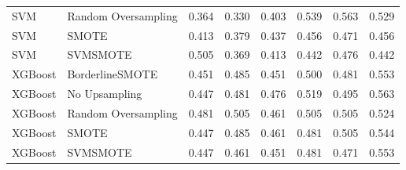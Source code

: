 \begin{tabular}{llllllll}
                         SVM & Random Oversampling & 0.364 &                     0.330 &                 0.403 &                  0.539 &                                   0.563 &     0.529 \\
                         SVM &               SMOTE & 0.413 &                     0.379 &                 0.437 &                  0.456 &                                   0.471 &     0.456 \\
                         SVM &            SVMSMOTE & 0.505 &                     0.369 &                 0.413 &                  0.442 &                                   0.476 &     0.442 \\
                     XGBoost &     BorderlineSMOTE & 0.451 &                     0.485 &                 0.451 &                  0.500 &                                   0.481 &     0.553 \\
                     XGBoost &       No Upsampling & 0.447 &                     0.481 &                 0.476 &                  0.519 &                                   0.495 &     0.563 \\
                     XGBoost & Random Oversampling & 0.481 &                     0.505 &                 0.461 &                  0.505 &                                   0.505 &     0.524 \\
                     XGBoost &               SMOTE & 0.447 &                     0.485 &                 0.461 &                  0.481 &                                   0.505 &     0.544 \\
                     XGBoost &            SVMSMOTE & 0.447 &                     0.461 &                 0.451 &                  0.481 &                                   0.471 &     0.553 \\
\bottomrule
\end{tabular}
